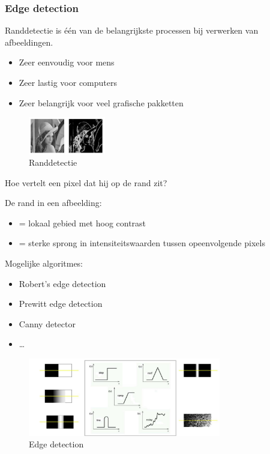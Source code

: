 \documentclass{article}
\begin{document}
\subsubsection{Edge detection}

Randdetectie is één van de belangrijkste processen bij verwerken van afbeeldingen.

\begin{itemize}
    \item Zeer eenvoudig voor mens
    \item Zeer lastig voor computers
    \item Zeer belangrijk voor veel grafische pakketten
\end{itemize}

\begin{figure}[H]
    \centering
    \includegraphics[width=0.3\textwidth]{convolution-edgedetection2.png}
    \caption{Randdetectie}
\end{figure}


Hoe vertelt een pixel dat hij op de rand zit?

De rand in een afbeelding:

\begin{itemize}
    \item = lokaal gebied met hoog contrast
    \item = sterke sprong in intensiteitswaarden tussen opeenvolgende pixels
\end{itemize}

Mogelijke algoritmes:

\begin{itemize}
    \item Robert's edge detection
    \item Prewitt edge detection
    \item Canny detector
    \item \dots
\end{itemize}

\begin{figure}[H]
    \centering
    \includegraphics[width=0.75\textwidth]{convolution-edgedetection.png}
    \caption{Edge detection}
\end{figure}
\end{document}
